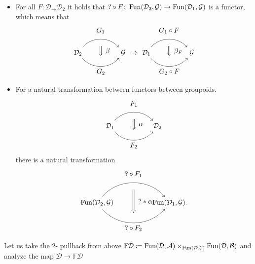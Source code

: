 \begin{construction}
\begin{Interlude}
\begin{itemize}
			\item 
			For all $  F \colon \mathcal{ D }_ \to \mathcal{ D }_2 $ it holds that $ ? \circ F \colon \operatorname{Fun} ( \mathcal{D}_2 , \mathcal{G} ) \to \operatorname{Fun} ( \mathcal{ D }_1 , \mathcal{G} ) $ is a functor, which means that 
			\[
			\begin{tikzcd}
				\mathcal{ D }_2
				\arrow[bend left=50]{rr}[name=U',label=above:$G_1$]{}
				\arrow[bend right=50]{rr}[name=D',label=below:$G_2$]{}
				&&
				\mathcal{ G }
				\arrow[shorten <=10pt,shorten >=10pt,Rightarrow,to path={(U') -- node[label=right:$\beta$] {} (D')}]{} 
			\end{tikzcd}
		\mapsto
			\begin{tikzcd}
				\mathcal{ D }_1
				\arrow[bend left=50]{rr}[name=U',label=above:$G_1 \circ F $]{}
				\arrow[bend right=50]{rr}[name=D',label=below:$G_2 \circ F $]{}
				&&
				\mathcal{ G }
				\arrow[shorten <=10pt,shorten >=10pt,Rightarrow,to path={(U') -- node[label=right:$\beta_F$] {} (D')}]{} 
			\end{tikzcd}
			\] 
			
			\item 
			For a natural transformation between functors between groupoids.
			\[
			\begin{tikzcd}
				\mathcal{ D }_1
				\arrow[bend left=50]{rr}[name=U',label=above:$F_1$]{}
				\arrow[bend right=50]{rr}[name=D',label=below:$F_2$]{}
				&&
				\mathcal{ D }_2
				\arrow[shorten <=10pt,shorten >=10pt,Rightarrow,to path={(U') -- node[label=right:$\alpha$] {} (D')}]{} 
			\end{tikzcd}
			\]
			there is a natural transformation
			\[
			\begin{tikzcd}
				\Fun( \mathcal{ D }_2 , \mathcal{ G } )
				\arrow[bend left=50]{rr}[name=U',label=above:$? \circ F_1$]{}
				\arrow[bend right=50]{rr}[name=D',label=below:$? \circ F_2$]{}
				&&
				\Fun( \mathcal{ D }_1 , \mathcal{ G } ).
				\arrow[shorten <=10pt,shorten >=10pt,Rightarrow,to path={(U') -- node[label=right:$? * \alpha$] {} (D')}]{} 
			\end{tikzcd}
			\]
		\end{itemize} 
	\end{Interlude}
\end{construction}

Let us take the 2- pullback from above $ \mathbb{ F } \mathcal{D} \coloneqq \operatorname{Fun} ( \mathcal{ D } , \mathcal{ A } ) \times_{ \operatorname{Fun} ( \mathcal{ D } , \mathcal{ C } ) } \operatorname{Fun} ( \mathcal{ D } , \mathcal{ B } ) $ and analyze the map $ \mathcal{ D } \to \mathbb{ F } \mathcal{ D } $ 

